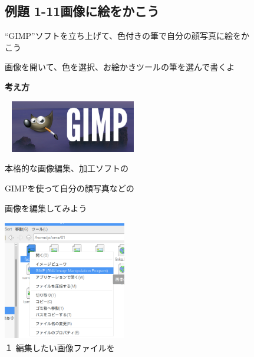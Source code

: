 \documentclass[a4paper,12pt]{jarticle}
\begin{document}
\begin{figure}[ht]
  \subsection{例題 1-11画像に絵をかこう}

  \bigskip

  “GIMP”ソフトを立ち上げて、色付きの筆で自分の顔写真に絵をかこう

  画像を開いて、色を選択、お絵かきツールの筆を選んで書くよ

  \textbf{考え方}



  \begin{minipage}{\textwidth}
    \centering
    \includegraphics[width=6.112cm,height=2.284cm]{textbook-img123.png}
    \begin{minipage}[b]{8.617cm}

      本格的な画像編集、加工ソフトの

      GIMPを使って自分の顔写真などの

      画像を編集してみよう
    \end{minipage}


  \end{minipage}
  \bigskip




  \begin{minipage}{\textwidth}
    \centering
    \begin{minipage}{5.852cm}
      \includegraphics[width=5.359cm,height=5.258cm]{textbook-img124.png}\\
      １ 編集したい画像ファイルを


\end{minipage}
\end{minipage}
\end{figure}
\end{document}
